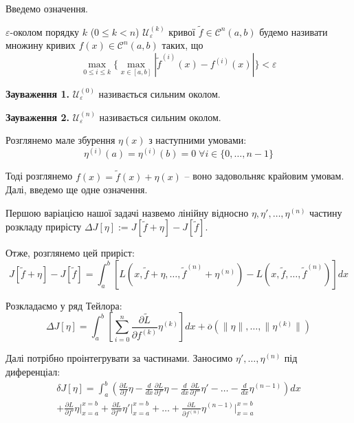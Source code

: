 \documentclass[14pt]{extarticle}
\newcommand{\<}{\langle}
\renewcommand{\>}{\rangle}
\theoremstyle{mystyle}{\newtheorem{definition}{Definition}[section]}
\theoremstyle{mystyle}{\newtheorem{proposition}[definition]{Proposition}}
\theoremstyle{mystyle}{\newtheorem{theorem}[definition]{Theorem}}
\theoremstyle{mystyle}{\newtheorem{lemma}[definition]{Lemma}}
\theoremstyle{mystyle}{\newtheorem{corollary}[definition]{Corollary}}
\theoremstyle{mystyle}{\newtheorem*{remark}{Remark}}
\theoremstyle{mystyle}{\newtheorem*{remarks}{Remarks}}
\theoremstyle{mystyle}{\newtheorem*{example}{Example}}
\theoremstyle{mystyle}{\newtheorem*{examples}{Examples}}
\theoremstyle{definition}{\newtheorem*{exercise}{Exercise}}
\theoremstyle{cstyle}{\newtheorem*{cthm}{}}
\theoremstyle{warn}
\begin{document}
Введемо означення.

\begin{definition}
    $\varepsilon$-околом порядку $k$ ($0 \leq k < n$) $\mathcal{U}_{\varepsilon}^{(k)}$ кривої $\widetilde{f} \in \mathcal{C}^n(a,b)$ будемо 
    називати множину кривих $f(x) \in \mathcal{C}^n(a,b)$ таких, що
    \begin{equation}
        \max_{0 \leq i \leq k} \{\max_{x \in [a,b]}|\widetilde{f}^{(i)}(x)-f^{(i)}(x)|\} < \varepsilon
    \end{equation}
\end{definition}

\textbf{Зауваження 1.} $\mathcal{U}_{\varepsilon}^{(0)}$ називається сильним околом.

\textbf{Зауваження 2.} $\mathcal{U}_{\varepsilon}^{(n)}$ називається сильним околом.

Розглянемо мале збурення $\eta(x)$ з наступними умовами:
\begin{equation}
    \eta^{(i)}(a) = \eta^{(i)}(b) = 0 \; \forall i \in \{0,\dots,n-1\}
\end{equation}

Тоді розглянемо $f(x) = \widetilde{f}(x)+\eta(x)$ -- воно задовольняє крайовим умовам. Далі, введемо 
ще одне означення.

\begin{definition}
    Першою варіацією нашої задачі назвемо лінійну відносно $\eta,\eta',\dots,\eta^{(n)}$ частину розкладу прирісту $\Delta J[\eta]:=J[\widetilde{f}+\eta]-J[\widetilde{f}]$.
\end{definition}

Отже, розглянемо цей приріст:
\begin{equation}
    J[\widetilde{f}+\eta]-J[\widetilde{f}] = \int_a^b \left[L(x,\widetilde{f}+\eta,\dots,\widetilde{f}^{(n)}+\eta^{(n)}) - L(x,\widetilde{f},\dots,\widetilde{f}^{(n)})\right]dx
\end{equation}

Розкладаємо у ряд Тейлора:
\begin{equation}
    \Delta J[\eta] = \int_a^b\left[\sum_{i=0}^n \frac{\partial \widetilde{L}}{\partial f^{(k)}}\eta^{(k)}\right]dx + \overline{o}(\|\eta\|,\dots,\|\eta^{(k)}\|)
\end{equation}

Далі потрібно проінтегрувати за частинами. Заносимо $\eta',\dots,\eta^{(n)}$ під диференціал:
\begin{gather}
    \delta J[\eta] = \int_a^b \left(\frac{\partial L}{\partial f}\eta - \frac{d}{dx}\frac{\partial L}{\partial f'}\eta - \frac{d}{dx}\frac{\partial L}{\partial f''}\eta' - \dots -\frac{d}{dx}\eta^{(n-1)}\right)dx \nonumber \\
    + \frac{\partial L}{\partial f'}\eta\Big|_{x=a}^{x=b} + \frac{\partial L}{\partial f''}\eta'\Big|_{x=a}^{x=b} + \dots + \frac{\partial L}{\partial f^{(n)}}\eta^{(n-1)}\Big|_{x=a}^{x=b}
\end{gather}
\end{document}
